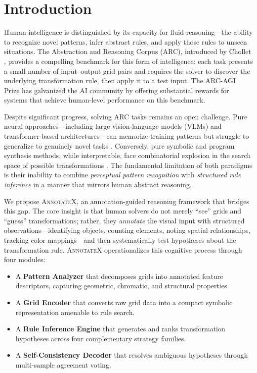 \documentclass[conference,10pt,letterpaper]{IEEEtran}
\newcommand{\annotatexname}{\textsc{AnnotateX}}
\begin{document}
\section{Introduction}
\label{sec:introduction}

Human intelligence is distinguished by its capacity for fluid reasoning---the ability to recognize novel patterns, infer abstract rules, and apply those rules to unseen situations. The Abstraction and Reasoning Corpus (ARC), introduced by Chollet \cite{chollet2019measure}, provides a compelling benchmark for this form of intelligence: each task presents a small number of input--output grid pairs and requires the solver to discover the underlying transformation rule, then apply it to a test input. The ARC-AGI Prize \cite{arcprize2020} has galvanized the AI community by offering substantial rewards for systems that achieve human-level performance on this benchmark.

Despite significant progress, solving ARC tasks remains an open challenge. Pure neural approaches---including large vision-language models (VLMs) and transformer-based architectures---can memorize training patterns but struggle to generalize to genuinely novel tasks \cite{mitchell2021abstraction}. Conversely, pure symbolic and program synthesis methods, while interpretable, face combinatorial explosion in the search space of possible transformations \cite{ellis2021dreamcoder}. The fundamental limitation of both paradigms is their inability to combine \emph{perceptual pattern recognition} with \emph{structured rule inference} in a manner that mirrors human abstract reasoning.

We propose \annotatexname, an annotation-guided reasoning framework that bridges this gap. The core insight is that human solvers do not merely ``see'' grids and ``guess'' transformations; rather, they \emph{annotate} the visual input with structured observations---identifying objects, counting elements, noting spatial relationships, tracking color mappings---and then systematically test hypotheses about the transformation rule. \annotatexname{} operationalizes this cognitive process through four modules:

\begin{itemize}[leftmargin=*,nosep]
    \item A \textbf{Pattern Analyzer} that decomposes grids into annotated feature descriptors, capturing geometric, chromatic, and structural properties.
    \item A \textbf{Grid Encoder} that converts raw grid data into a compact symbolic representation amenable to rule search.
    \item A \textbf{Rule Inference Engine} that generates and ranks transformation hypotheses across four complementary strategy families.
    \item A \textbf{Self-Consistency Decoder} that resolves ambiguous hypotheses through multi-sample agreement voting.
\end{itemize}
\end{document}
